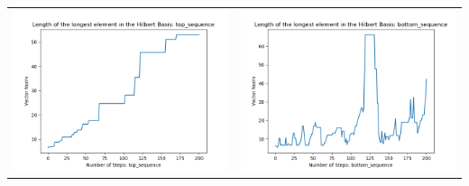 \documentclass[10pt]{article}
\begin{document}
\begin{tabular}{c|c}
\begin{minipage}{.4\textwidth}
\includegraphics[width=\textwidth]{"DATA/5d/6 generators 2 bound I/top_sequence LENGTH"}
\end{minipage} &
\begin{minipage}{.4\textwidth}
\includegraphics[width=\textwidth]{"DATA/5d/6 generators 2 bound I bottomup/bottom_sequence LENGTH"}
\end{minipage}
\end{tabular}
\end{document}
